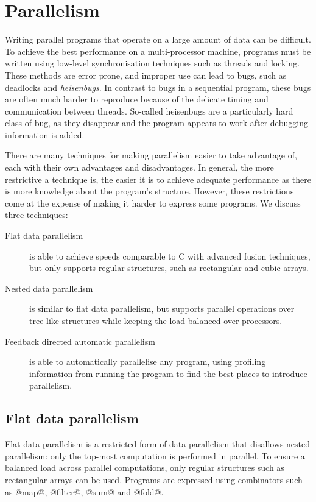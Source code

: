 \section{Parallelism}
Writing parallel programs that operate on a large amount of data can be difficult.
To achieve the best performance on a multi-processor machine, programs must be written using low-level synchronisation techniques such as threads and locking.
These methods are error prone, and improper use can lead to bugs, such as deadlocks and \emph{heisenbugs}.
In contrast to bugs in a sequential program, these bugs are often much harder to reproduce because of the delicate timing and communication between threads.
So-called heisenbugs are a particularly hard class of bug, as they disappear and the program appears to work after debugging information is added.

There are many techniques for making parallelism easier to take advantage of,
each with their own advantages and disadvantages.
In general, the more restrictive a technique is, the easier it is to achieve adequate performance
as there is more knowledge about the program's structure.
However, these restrictions come at the expense of making it harder to express some programs.
We discuss three techniques:

\begin{description}
\item[Flat   data parallelism]
is able to achieve speeds comparable to C with advanced fusion techniques,
but only supports regular structures, such as rectangular and cubic arrays.

\item[Nested data parallelism]
is similar to flat data parallelism,
but supports parallel operations over tree-like structures
while keeping the load balanced over processors.

\item[Feedback directed automatic parallelism]
is able to automatically parallelise any program,
using profiling information from running the program
to find the best places to introduce parallelism. 
\end{description}


\subsection{Flat data parallelism}
Flat data parallelism is a restricted form of data parallelism that disallows nested parallelism:
only the top-most computation is performed in parallel.
To ensure a balanced load across parallel computations, only regular structures such as rectangular arrays can be used.
Programs are expressed using combinators such as @map@, @filter@, @sum@ and @fold@.

